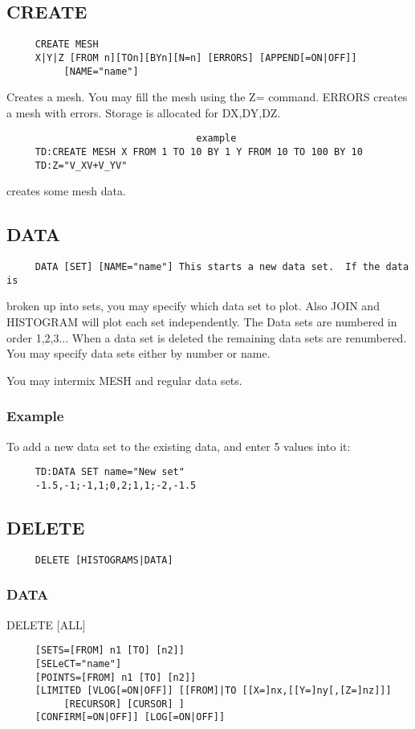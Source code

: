 \subsection{CREATE}
\begin{verbatim}
     CREATE MESH 
     X|Y|Z [FROM n][TOn][BYn][N=n] [ERRORS] [APPEND[=ON|OFF]]
          [NAME="name"] 
\end{verbatim}
Creates a mesh.  You may fill the mesh using the Z= command.  
ERRORS creates a mesh with errors.  Storage is allocated for DX,DY,DZ.  

\begin{verbatim}
                                 example
     TD:CREATE MESH X FROM 1 TO 10 BY 1 Y FROM 10 TO 100 BY 10 
     TD:Z="V_XV+V_YV" 
\end{verbatim}
creates some mesh data.  
\subsection{DATA}
\begin{verbatim}
     DATA [SET] [NAME="name"] This starts a new data set.  If the data is
\end{verbatim}
broken up into sets, you may specify which data set to plot.  Also JOIN
and HISTOGRAM will plot each set independently.  The Data sets are
numbered in order 1,2,3...  When a data set is deleted the remaining data
sets are renumbered.  You may specify data sets either by number or name. 

You may intermix MESH and regular data sets.  
\subsubsection{Example}
To add a new data set to the existing data, and enter 5 values into it: 
\begin{verbatim}
     TD:DATA SET name="New set" 
     -1.5,-1;-1,1;0,2;1,1;-2,-1.5 
\end{verbatim}
\subsection{DELETE}
\begin{verbatim}
     DELETE [HISTOGRAMS|DATA] 
\end{verbatim}
\subsubsection{DATA}
DELETE [ALL] 
\begin{verbatim}
     [SETS=[FROM] n1 [TO] [n2]] 
     [SELeCT="name"] 
     [POINTS=[FROM] n1 [TO] [n2]] 
     [LIMITED [VLOG[=ON|OFF]] [[FROM]|TO [[X=]nx,[[Y=]ny[,[Z=]nz]]]
          [RECURSOR] [CURSOR] ] 
     [CONFIRM[=ON|OFF]] [LOG[=ON|OFF]] 
\end{verbatim}

